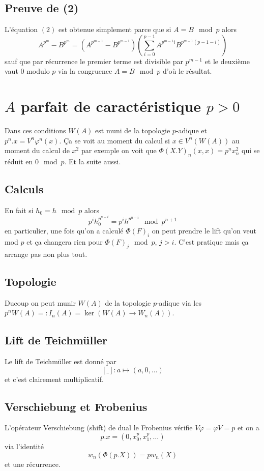 \documentclass[a4paper,12pt]{article}
\theoremstyle{plain}
\theoremstyle{definition}
\theoremstyle{remark}
\begin{document}
\subsection{Preuve de (2)}
L'équation $(2)$ est obtenue simplement parce que si 
$A=B\mod p$ alors 
\[A^{p^m}-B^{p^m}=(A^{p^{m-1}}-B^{p^{m-1}})\left(\sum_{i=0}^{p-1} A^{p^{m-1}i}B^{p^{m-1}(p-1-i)}\right)\]
sauf que par récurrence le premier terme est divisible par
$p^{m-1}$ et le deuxième vaut $0$ modulo $p$ via la congruence
$A=B\mod p$ d'où le résultat.


\section{$A$ parfait de caractéristique $p>0$}
Dans ces conditions $W(A)$ est muni de la topologie $p$-adique et
$p^n.x=V^n\varphi^n(x)$. Ça se voit au moment du calcul si 
$x\in V^n(W(A))$ au moment du calcul de $x^2$ par exemple on voit
que $\Phi(X.Y)_n(x,x)=p^nx_n^2$ qui se réduit en $0\mod p$. Et
la suite aussi.

\subsection{Calculs}
En fait si $h_0=h\mod p$ alors 
\[p^ih_0^{p^{n-i}}=p^ih^{p^{n-i}}\mod p^{n+1}\]
en particulier, une fois qu'on a calculé $\Phi(F)_i$ on peut
prendre le lift qu'on veut mod $p$ et ça changera rien pour
$\Phi(F)_j\mod p$, $j>i$. C'est pratique mais ça arrange pas non
plus tout.


\subsection{Topologie}
Ducoup on peut munir $W(A)$ de la topologie $p$-adique via les
$p^nW(A)=:I_n(A)=\ker(W(A)\to W_n(A))$. 

\subsection{Lift de Teichmüller}
Le lift de Teichmüller est donné par
\[[\_]\colon a\mapsto (a,0,\ldots)\]
et c'est clairement multiplicatif.
\subsection{Verschiebung et Frobenius}
L'opérateur Verschiebung (shift) de dual le Frobenius vérifie
$V\varphi=\varphi V=p$ et on a 
\[p.x=(0,x_0^p,x_1^p,\ldots)\]
via l'identité 
\[w_n(\Phi(p.X))=pw_n(X)\]
et une récurrence. 
\end{document}
